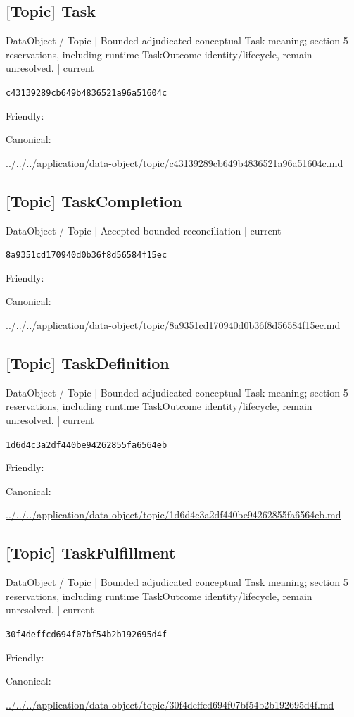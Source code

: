 \documentclass[10pt,a4paper]{article}
\begin{document}
\subsection*{[Topic] Task}
{\small DataObject / Topic | Bounded adjudicated conceptual Task meaning; section 5 reservations, including runtime TaskOutcome identity/lifecycle, remain unresolved. | current}\par
\texttt{c43139289cb649b4836521a96a51604c}\par
Friendly: \par
Canonical: \par
{\footnotesize\url{../../../application/data-object/topic/c43139289cb649b4836521a96a51604c.md}}\par
\subsection*{[Topic] TaskCompletion}
{\small DataObject / Topic | Accepted bounded reconciliation | current}\par
\texttt{8a9351cd170940d0b36f8d56584f15ec}\par
Friendly: \par
Canonical: \par
{\footnotesize\url{../../../application/data-object/topic/8a9351cd170940d0b36f8d56584f15ec.md}}\par
\subsection*{[Topic] TaskDefinition}
{\small DataObject / Topic | Bounded adjudicated conceptual Task meaning; section 5 reservations, including runtime TaskOutcome identity/lifecycle, remain unresolved. | current}\par
\texttt{1d6d4c3a2df440be94262855fa6564eb}\par
Friendly: \par
Canonical: \par
{\footnotesize\url{../../../application/data-object/topic/1d6d4c3a2df440be94262855fa6564eb.md}}\par
\subsection*{[Topic] TaskFulfillment}
{\small DataObject / Topic | Bounded adjudicated conceptual Task meaning; section 5 reservations, including runtime TaskOutcome identity/lifecycle, remain unresolved. | current}\par
\texttt{30f4deffcd694f07bf54b2b192695d4f}\par
Friendly: \par
Canonical: \par
{\footnotesize\url{../../../application/data-object/topic/30f4deffcd694f07bf54b2b192695d4f.md}}\par
\end{document}
